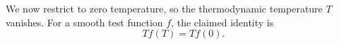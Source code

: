 \documentclass{article}
\begin{document}
We now restrict to zero temperature, so the thermodynamic temperature $T$
vanishes.  For a smooth test function $f$, the claimed identity is
\begin{equation}
T f(T) = T f(0) .
\label{eq:zero-temperature}
\end{equation}
\end{document}
